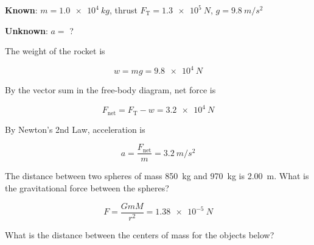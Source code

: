 \documentclass{exam}
\begin{document}
\begin{questions}
\begin{solution}
\textbf{Known}: $m = \SI{1.0e4}{kg}$, thrust $F_{\text{T}} = \SI{1.3e5}{N}$, $g = \SI{9.8}{m/s^2}$

\textbf{Unknown}: $a =$ ?

\begin{center}
\end{center}

The weight of the rocket is 

\begin{equation*}
    w = m g = \SI{9.8e4}{N}
\end{equation*}

By the vector sum in the free-body diagram, net force is

\begin{equation*}
    F_{\mathrm{net}} = F_{\text{T}} - w = \SI{3.2e4}{N}
\end{equation*}

By Newton's 2nd Law, acceleration is

\begin{equation*}
   a = \frac{F_{\mathrm{net}}}{m} = \SI{3.2}{m/s^2}
\end{equation*}

\end{solution}

\question
The distance between two spheres of mass \SI{850}{kg} and \SI{970}{kg} is \SI{2.00}{m}. What is the gravitational force between the spheres?

\begin{solution}

\begin{equation*}
    F = \frac{G m M}{r^2} = \SI{1.38e-5}{N}
\end{equation*}
\end{solution}

\question 
What is the distance between the centers of mass for the objects below?
\vspace{-2em}

\begin{figure}[h!]
    \centering
\end{figure}


\end{questions}
\end{document}
